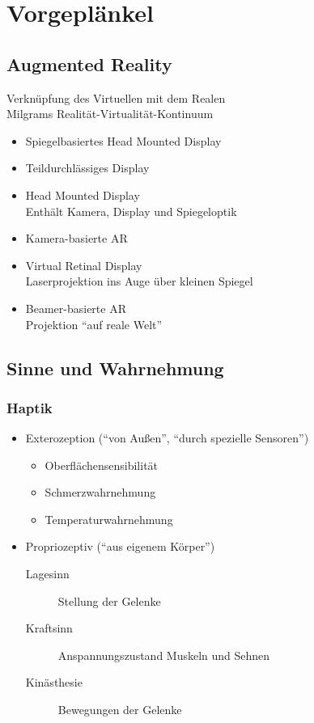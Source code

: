 \documentclass[a4paper, 12pt]{article}
\begin{document}
\tableofcontents
\pagebreak



\section{Vorgeplänkel}


\subsection{Augmented Reality}
Verknüpfung des Virtuellen mit dem Realen\\
Milgrams Realität-Virtualität-Kontinuum
\begin{itemize}
  \item Spiegelbasiertes Head Mounted Display
  \item Teildurchlässiges Display
  \item Head Mounted Display\\
    Enthält Kamera, Display und Spiegeloptik
  \item Kamera-basierte AR
  \item Virtual Retinal Display\\
    Laserprojektion ins Auge über kleinen Spiegel
  \item Beamer-basierte AR\\
    Projektion ``auf reale Welt''
\end{itemize}


\subsection{Sinne und Wahrnehmung}

\subsubsection*{Haptik}
\begin{itemize}
  \item Exterozeption (``von Außen'', ``durch spezielle Sensoren'')
    \begin{itemize}
      \item Oberflächensensibilität
      \item Schmerzwahrnehmung
      \item Temperaturwahrnehmung
    \end{itemize}
  \item Propriozeptiv (``aus eigenem Körper'')
    \begin{description}
      \item[Lagesinn] Stellung der Gelenke
      \item[Kraftsinn] Anspannungszustand Muskeln und Sehnen
      \item[Kinästhesie] Bewegungen der Gelenke
    \end{description}
\end{itemize}
\end{document}
